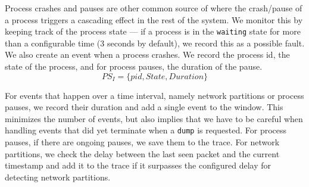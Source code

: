Process crashes and pauses are other common source of \efibshort where the crash/pause of a process triggers a cascading effect in the rest of the system.
We monitor this by keeping track of the process state --- if a process is in the \texttt{waiting} state for more than a configurable time (3 seconds by default), we record this as a possible fault.
We also create an event when a  process crashes.
We record the process id, the state of the process, and for process pauses, the duration of the pause.
\[PS_I = \{pid, State, Duration\}  \]



For events that happen over a time interval, namely network partitions or process pauses, we record their duration and add a single event to the window.
This minimizes the number of events, but also implies that we have to be careful when handling events that did yet terminate when a \texttt{dump} is requested.
For process pauses, if there are ongoing pauses, we save them to the trace.
For network partitions, we check the delay between the last seen packet and the current timestamp and add it to the trace if it surpasses the configured delay for detecting network partitions.

